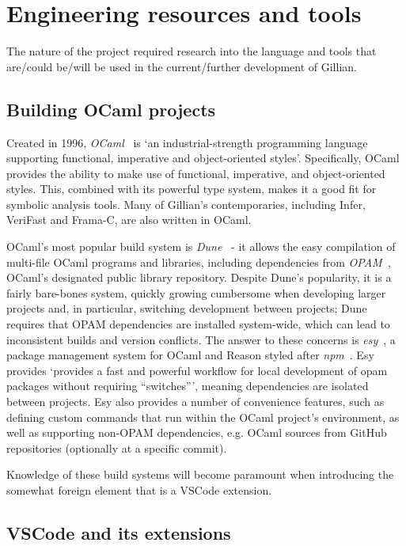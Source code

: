 \section{Engineering resources and tools}
\label{sec:background:engineering-tools}

The nature of the project required research into the language and tools that
are/could be/will be used in the current/further development of Gillian.

\subsection{Building OCaml projects}

Created in 1996, \textit{OCaml}~\cite{ocaml} is `an industrial-strength
programming language supporting functional, imperative and object-oriented
styles'. Specifically, OCaml provides the ability to make use of functional,
imperative, and object-oriented styles. This, combined with its powerful type
system, makes it a good fit for symbolic analysis tools. Many of Gillian's
contemporaries, including Infer, VeriFast and Frama-C, are also written in OCaml.

OCaml's most popular build system is \textit{Dune}~\cite{dune} - it allows the
easy compilation of multi-file OCaml programs and libraries, including
dependencies from \textit{OPAM}~\cite{opam}, OCaml's designated public library
repository. Despite Dune's popularity, it is a fairly bare-bones system, quickly
growing cumbersome when developing larger projects and, in particular,
switching development between projects; Dune requires that OPAM dependencies
are installed system-wide, which can lead to inconsistent builds and version
conflicts. The answer to these concerns is \textit{esy}~\cite{esy}, a package
management system for OCaml and Reason styled after \textit{npm}~\cite{npm}.
Esy provides `provides a fast and powerful workflow for local development of
opam packages without requiring ``switches''', meaning dependencies are isolated
between projects. Esy also provides a number of convenience features, such as
defining custom commands that run within the OCaml project's environment, as
well as supporting non-OPAM dependencies, e.g. OCaml sources from GitHub
repositories (optionally at a specific commit).

Knowledge of these build systems will become paramount when introducing the
somewhat foreign element that is a VSCode extension.


\subsection{VSCode and its extensions}
\label{sec:vscode}

